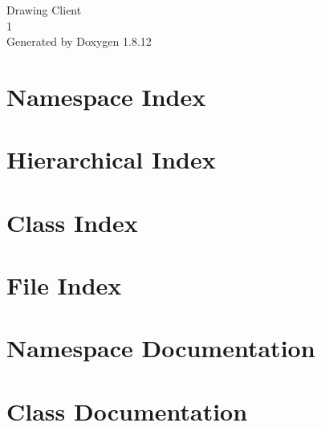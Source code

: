 \documentclass[twoside]{book}
\newcommand{\+}{\discretionary{\mbox{\scriptsize$\hookleftarrow$}}{}{}}
\newcommand{\clearemptydoublepage}{%
  \newpage{\pagestyle{empty}\cleardoublepage}%
}
\begin{document}
\hypersetup{pageanchor=false,
             bookmarksnumbered=true,
             pdfencoding=unicode
            }
\begin{titlepage}
\vspace*{7cm}
\begin{center}%
{\Large Drawing Client \\[1ex]\large 1 }\\
\vspace*{1cm}
{\large Generated by Doxygen 1.8.12}\\
\end{center}
\end{titlepage}
\clearemptydoublepage
{}
\tableofcontents
\clearemptydoublepage
{}
\hypersetup{pageanchor=true}

\chapter{Namespace Index}

\chapter{Hierarchical Index}

\chapter{Class Index}

\chapter{File Index}

\chapter{Namespace Documentation}

\chapter{Class Documentation}





























\end{document}
